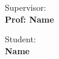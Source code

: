 \begin{titlepage}
\begin{minipage}[t]{0.47\textwidth}
	{\large{Supervisor:}{\normalsize\vspace{3mm}
	\bf\\ \large{Prof: Name} \normalsize\vspace{3mm}\bf}}          %
\end{minipage}
\hfill
\begin{minipage}[t]{0.47\textwidth}\raggedleft
	{\large{Student:}{\normalsize\vspace{3mm} \bf\\ \large{Name}}} %
\end{minipage}

\vspace{40 mm}
\hrulefill
\\                           %

\end{titlepage}
